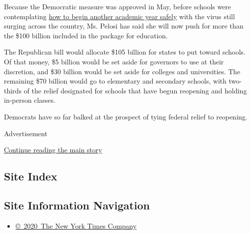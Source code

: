 Because the Democratic measure was approved in May, before schools were
contemplating
\href{https://www.nytimes.com/2020/07/11/health/coronavirus-schools-reopen.html}{how
to begin another academic year safely} with the virus still surging
across the country, Ms. Pelosi has said she will now push for more than
the \$100 billion included in the package for education.

The Republican bill would allocate \$105 billion for states to put
toward schools. Of that money, \$5 billion would be set aside for
governors to use at their discretion, and \$30 billion would be set
aside for colleges and universities. The remaining \$70 billion would go
to elementary and secondary schools, with two-thirds of the relief
designated for schools that have begun reopening and holding in-person
classes.

Democrats have so far balked at the prospect of tying federal relief to
reopening.

Advertisement

\protect\hyperlink{after-bottom}{Continue reading the main story}

\hypertarget{site-index}{%
\subsection{Site Index}\label{site-index}}

\hypertarget{site-information-navigation}{%
\subsection{Site Information
Navigation}\label{site-information-navigation}}

\begin{itemize}
\tightlist
\item
  \href{https://help.nytimes.com/hc/en-us/articles/115014792127-Copyright-notice}{©~2020~The
  New York Times Company}
\end{itemize}

